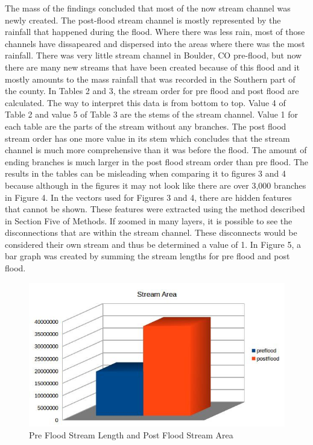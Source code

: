 \documentclass[twoside]{article}
\begin{document}
\begin{multicols}{2}
The mass of the findings concluded that most of the now stream channel was newly created. The post-flood stream channel is mostly represented by the rainfall that happened during the flood. Where there was less rain, most of those channels have dissapeared and dispersed into the areas where there was the most rainfall. There was very little stream channel in Boulder, CO pre-flood, but now there are many new streams that have been created because of this flood and it mostly amounts to the mass rainfall that was recorded in the Southern part of the county. In Tables 2 and 3, the stream order for pre flood and post flood are calculated. The way to interpret this data is from bottom to top. Value 4 of Table 2 and value 5 of Table 3 are the stems of the stream channel. Value 1 for each table are the parts of the stream without any branches. The post flood stream order has one more value in its stem which concludes that the stream channel is much more comprehensive than it was before the flood. The amount of ending branches is much larger in the post flood stream order than pre flood. The results in the tables can be misleading when comparing it to figures 3 and 4 because although in the figures it may not look like there are over 3,000 branches in Figure 4. In the vectors used for Figures 3 and 4, there are hidden features that cannot be shown. These features were extracted using the method described in Section Five of Methods. If zoomed in many layers, it is possible to see the disconnections that are within the stream channel. These disconnects would be considered their own stream and thus be determined a value of 1. In Figure 5, a bar graph was created by summing the stream lengths for pre flood and post flood. 
\newline
\begin{figure} %
\includegraphics[width=2\columnwidth, scale=2]{prevspostarea.jpg}
\caption{Pre Flood Stream Length and Post Flood Stream Area\label{fig:length}}
\end{figure}



\end{multicols}
\end{document}
